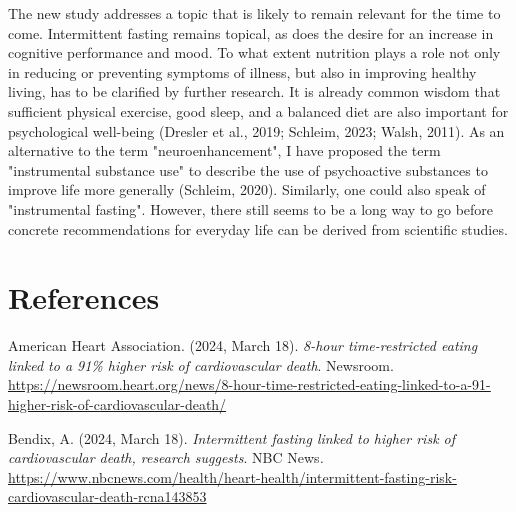 \documentclass[authordate, empirical]{jote-new-article}
\begin{document}
The new study addresses a topic that is likely to remain relevant for the time to come. Intermittent fasting remains topical, as does the desire for an increase in cognitive performance and mood. To what extent nutrition plays a role not only in reducing or preventing symptoms of illness, but also in improving healthy living, has to be clarified by further research. It is already common wisdom that sufficient physical exercise, good sleep, and a balanced diet are also important for psychological well-being (Dresler et al., 2019; Schleim, 2023; Walsh, 2011). As an alternative to the term "neuroenhancement", I have proposed the term "instrumental substance use" to describe the use of psychoactive substances to improve life more generally (Schleim, 2020). Similarly, one could also speak of "instrumental fasting". However, there still seems to be a long way to go before concrete recommendations for everyday life can be derived from scientific studies.



















\section{References}



\hspace*{\parindent}American Heart Association. (2024, March 18). \emph{8-hour time-restricted eating linked to a 91\% higher risk of cardiovascular death}. Newsroom. \href{https://newsroom.heart.org/news/8-hour-time-restricted-eating-linked-to-a-91-higher-risk-of-cardiovascular-death/}{https://newsroom.heart.org/news/8-hour-time-restricted-eating-linked-to-a-91-higher-risk-of-cardiovascular-death/}







Bendix, A. (2024, March 18). \emph{Intermittent fasting linked to higher risk of cardiovascular death, research suggests}. NBC News\emph{.} \url{https://www.nbcnews.com/health/heart-health/intermittent-fasting-risk-cardiovascular-death-rcna143853}
\end{document}
